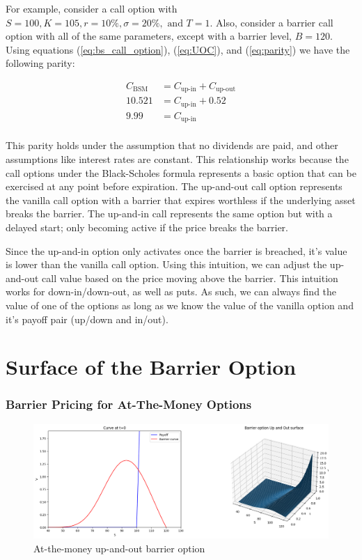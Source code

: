 For example, consider a call option with $S=100, K=105, r=10\%, \sigma=20\%, \text{ and } T=1.$ Also, consider a barrier call option with all of the same parameters, except with a barrier level, $B=120$. Using equations (\ref{eq:bs_call_option}), (\ref{eq:UOC}), and (\ref{eq:parity})  we have the following parity:

\[
\begin{aligned}
	C_{\text{BSM}}&=C_{\text{up-in}}+C_{\text{up-out}}\\
				  10.521&=C_{\text{up-in}}+0.52\\
				  9.99&=C_{\text{up-in}}\\
\end{aligned}	
\]
 
This parity holds under the assumption that no dividends are paid, and other assumptions like interest rates are constant. This relationship works because the call options under the Black-Scholes formula represents a basic option that can be exercised at any point before expiration. The up-and-out call option represents the vanilla call option with a barrier that expires worthless if the underlying asset breaks the barrier. The up-and-in call represents the same option but with a delayed start; only becoming active if the price breaks the barrier.

Since the up-and-in option only activates once the barrier is breached, it's value is lower than the vanilla call option. Using this intuition, we can adjust the up-and-out call value based on the price moving above the barrier. This intuition works for down-in/down-out, as well as puts. As such, we can always find the value of one of the options as long as we know the value of the vanilla option and it's payoff pair (up/down and in/out).

\section{Surface of the Barrier Option}
\subsubsection{Barrier Pricing for At-The-Money Options}

\begin{figure}[H]
	\centering
	\includegraphics[width=.90\linewidth]{content/images/surface.png}
	\caption{At-the-money up-and-out barrier option}
	\label{fig:surface}
\end{figure}

